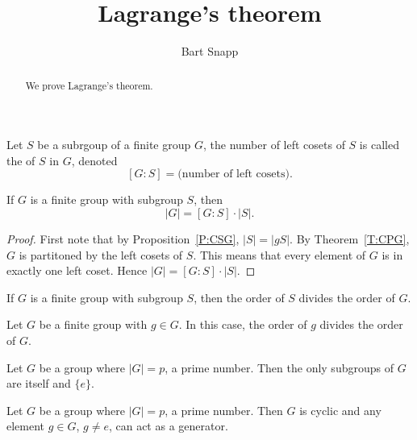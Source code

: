 \documentclass{ximera}
\author{Bart Snapp}
\title{Lagrange's theorem}
\begin{document}
\begin{abstract}
  We prove Lagrange's theorem.
\end{abstract}
\maketitle

\begin{definition}
  Let $S$ be a subrgoup of a finite group $G$, the number of left
  cosets of $S$ is called the  of $S$ in $G$, denoted
  \[
  [G:S] = \text{(number of left cosets)}.
  \]
\end{definition}



\begin{theorem}
  If $G$ is a finite group with subgroup $S$, then 
  \[
  |G| = [G:S]\cdot |S|.
  \]
  \begin{proof}
    First note that by Proposition~\ref{P:CSG}, $|S| = |gS|$. By
    Theorem~\ref{T:CPG}, $G$ is partitoned by the left cosets of
    $S$. This means that every element of $G$ is in exactly one left
    coset. Hence $|G| = [G:S]\cdot |S|$.
  \end{proof}
\end{theorem}

\begin{corollary}
  If $G$ is a finite group with subgroup $S$, then the order of $S$
  divides the order of $G$.
\end{corollary}

\begin{corollary}
  Let $G$ be a finite group with $g\in G$. In this case, the order of
  $g$ divides the order of $G$.
\end{corollary}


\begin{corollary}
  Let $G$ be a group where $|G|= p$, a prime number. Then the only
  subgroups of $G$ are itself and $\{e\}$.
\end{corollary}

\begin{corollary}
  Let $G$ be a group where $|G|= p$, a prime number. Then $G$ is
  cyclic and any element $g\in G$, $g\ne e$, can act as a generator.
\end{corollary}
\end{document}
